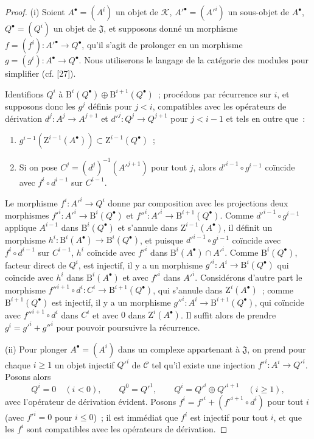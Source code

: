 \begin{proof}
\textup{(i)} Soient $A^\bullet=(A^i)$ un objet de $\mathcal K$,
$A'^\bullet=(A'^i)$ un sous-objet de $A^\bullet$,
$Q^\bullet=(Q^i)$ un objet de $\mathfrak J$, et supposons donné un morphisme
$f=(f^i):A'^\bullet\to Q^\bullet$, qu'il s'agit de prolonger en un morphisme
$g=(g^i):A^\bullet\to Q^\bullet$. Nous utiliserons le langage de la catégorie
des modules pour simplifier (cf. [27]).

Identifions $Q^i$ à
$\mathrm B^i(Q^\bullet)\oplus\mathrm B^{i+1}(Q^\bullet)$~; procédons par
récurrence sur $i$, et supposons donc les $g^j$ définis pour $j<i$,
compatibles avec les opérateurs de dérivation $d^j:A^j\to A^{j+1}$ et
$d'^j:Q^j\to Q^{j+1}$ pour $j<i-1$ et tels en outre que~:
\begin{enumerate}
  \item[$1^\circ$] $g^{i-1}(\mathrm Z^{i-1}(A^\bullet))\subset
    \mathrm Z^{i-1}(Q^\bullet)$~;
  \item[$2^\circ$] Si on pose $C^j=(d^j)^{-1}(A'^{j+1})$ pour tout $j$, alors
    $d'^{i-1}\circ g^{i-1}$ coïncide avec $f^i\circ d^{i-1}$ sur $C^{i-1}$.
\end{enumerate}
Le morphisme $f^i:A'^i\to Q^i$ donne par composition avec les projections
deux morphismes
$f'^i:A'^i\to\mathrm B^i(Q^\bullet)$ et
$f''^i:A'^i\to\mathrm B^{i+1}(Q^\bullet)$. Comme
$d'^{i-1}\circ g^{i-1}$ applique $A^{i-1}$ dans
$\mathrm B^i(Q^\bullet)$ et s'annule dans $\mathrm Z^{i-1}(A^\bullet)$, il
définit un morphisme
$h^i:\mathrm B^i(A^\bullet)\to\mathrm B^i(Q^\bullet)$, et puisque
$d'^{i-1}\circ g^{i-1}$ coïncide avec $f^i\circ d^{i-1}$ sur $C^{i-1}$,
$h^i$ coïncide avec $f'^i$ dans
$\mathrm B^i(A^\bullet)\cap A'^i$. Comme $\mathrm B^i(Q^\bullet)$, facteur
direct de $Q^i$, est injectif, il y a un morphisme
$g'^i:A^i\to\mathrm B^i(Q^\bullet)$ qui coïncide avec $h^i$ dans
$\mathrm B^i(A^\bullet)$ et avec $f'^i$ dans $A'^i$. Considérons d'autre part
le morphisme
$f''^{i+1}\circ d^i:C^i\to\mathrm B^{i+1}(Q^\bullet)$, qui s'annule dans
$\mathrm Z^i(A^\bullet)$~; comme $\mathrm B^{i+1}(Q^\bullet)$ est injectif,
il y a un morphisme $g''^i:A^i\to\mathrm B^{i+1}(Q^\bullet)$, qui coïncide
avec $f''^{i+1}\circ d^i$ dans $C^i$ et avec $0$ dans
$\mathrm Z^i(A^\bullet)$. Il suffit alors de prendre $g^i=g'^i+g''^i$ pour
pouvoir poursuivre la récurrence.

\textup{(ii)} Pour plonger $A^\bullet=(A^i)$ dans un complexe appartenant à
$\mathfrak J$, on prend pour chaque $i\geq1$ un objet injectif $Q'^i$ de
$\mathcal C$ tel qu'il existe une injection $f'^i:A^i\to Q'^i$. Posons alors
\[
  Q^i=0\quad(i<0),\qquad Q^0=Q'^1,\qquad
  Q^i=Q'^i\oplus Q'^{i+1}\quad(i\geq1),
\]
avec l'opérateur de dérivation évident. Posons
$f^i=f'^i+(f'^{i+1}\circ d^i)$ pour tout $i$ (avec $f'^i=0$ pour $i\leq0$)~;
il est immédiat que $f^i$ est injectif pour tout $i$, et que les $f^i$ sont
compatibles avec les opérateurs de dérivation.
\end{proof}

